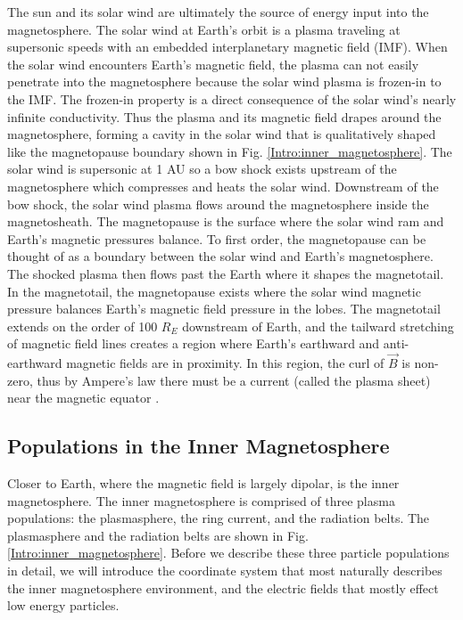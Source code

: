The sun and its solar wind are ultimately the source of energy input into the magnetosphere. The solar wind at Earth's orbit is a plasma traveling at supersonic speeds with an embedded interplanetary magnetic field (IMF). When the solar wind encounters Earth's magnetic field, the plasma can not easily penetrate into the magnetosphere because the solar wind plasma is frozen-in to the IMF. The frozen-in property is a direct consequence of the solar wind's nearly infinite conductivity. Thus the plasma and its magnetic field drapes around the magnetosphere, forming a cavity in the solar wind that is qualitatively shaped like the magnetopause boundary shown in Fig. \ref{Intro:inner_magnetosphere}. The solar wind is supersonic at 1 AU so a bow shock exists upstream of the magnetosphere which compresses and heats the solar wind. Downstream of the bow shock, the solar wind plasma flows around the magnetosphere inside the magnetosheath. The magnetopause is the surface where the solar wind ram and Earth's magnetic pressures balance. To first order, the magnetopause can be thought of as a boundary between the solar wind and Earth's magnetosphere. The shocked plasma then flows past the Earth where it shapes the magnetotail. In the magnetotail, the magnetopause exists where the solar wind magnetic pressure balances Earth's magnetic field pressure in the lobes. The magnetotail extends on the order of 100 $R_E$ downstream of Earth, and the tailward stretching of magnetic field lines creates a region where Earth's earthward and anti-earthward magnetic fields are in proximity. In this region, the curl of $\vec{B}$ is non-zero, thus by Ampere's law there must be a current (called the plasma sheet) near the magnetic equator \citep[e.g.][]{Eastwood2015}.

\subsection{Populations in the Inner Magnetosphere}\label{Intro:inner_mag}
Closer to Earth, where the magnetic field is largely dipolar, is the inner magnetosphere. The inner magnetosphere is comprised of three plasma populations: the plasmasphere, the ring current, and the radiation belts. The plasmasphere and the radiation belts are shown in Fig. \ref{Intro:inner_magnetosphere}. Before we describe these three particle populations in detail, we will introduce the coordinate system that most naturally describes the inner magnetosphere environment, and the electric fields that mostly effect low energy particles.


